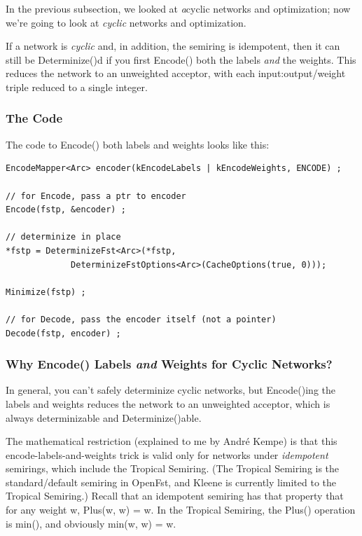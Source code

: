 \documentclass[letterpaper,12pt]{article}
\begin{document}
In the previous subsection, we looked at \emph{a}cyclic networks and optimization;
now we're going to look at \emph{cyclic} networks and optimization.

If a network is \emph{cyclic} and, in addition, the semiring is idempotent, then it can still be Determinize()d
if you first Encode() both the labels \emph{and} the weights.  This reduces the network to an
unweighted acceptor, with each input:output/weight triple reduced to a single
integer. 

\subsubsection{The Code}

The code to Encode() both labels and weights looks like this:


\begin{Verbatim}[fontsize=\footnotesize]
EncodeMapper<Arc> encoder(kEncodeLabels | kEncodeWeights, ENCODE) ;

// for Encode, pass a ptr to encoder
Encode(fstp, &encoder) ;

// determinize in place
*fstp = DeterminizeFst<Arc>(*fstp, 
             DeterminizeFstOptions<Arc>(CacheOptions(true, 0)));

Minimize(fstp) ;

// for Decode, pass the encoder itself (not a pointer)
Decode(fstp, encoder) ;
\end{Verbatim}

\subsubsection{Why Encode() Labels \emph{and} Weights for Cyclic Networks?}

In general, you can't safely determinize cyclic networks, but Encode()ing the labels and
weights reduces the network to an unweighted acceptor, which is always
determinizable and Determinize()able.

The mathematical restriction (explained to me by Andr\'e Kempe) is that this
encode-labels-and-weights trick is valid only
for networks under \emph{idempotent} semirings, which include the
	Tropical Semiring.  (The Tropical Semiring is the
	standard/default semiring in OpenFst, and Kleene is currently
	limited to the Tropical Semiring.)
	Recall that an idempotent semiring has that property that for any weight w,
	Plus(w, w) = w.  In the Tropical Semiring, the Plus() operation is min(), and
	obviously min(w, w) = w.
\end{document}
